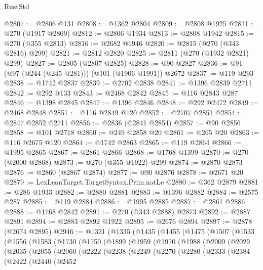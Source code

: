 \begin{lexlean}{RustStd}
\begin{coremodule}
@2807 := @2806 @131
@2808 := @1362 @2804
@2809 := @2808 @1925
@2811 := @270 (@1917 @2809)
@2812 := @2806 @1934
@2813 := @2808 @1942
@2815 := @270 (@355 @2813)
@2816 := @2682 @1946
@2820 := @2815 (@270 (@343 @2816) @299)
@2821 := @2812 @2820
@2825 := @2811 (@270 (@1932 @2821) @299)
@2827 := @2805 (@2807 @2825)
@2828 := @90 @2827
@2836 := @91 (@97 (@244 (@245 @281))) (@101 (@1906 @1991)) @2672
@2837 := @119 @293
@2838 := @1742 @2837
@2839 := @2702 @2838
@2841 := @1396 @2839 @2711
@2842 := @292 @133
@2843 := @2468 @2842
@2845 := @116 @2843 @287
@2846 := @1398 @2845
@2847 := @1396 @2846
@2848 := @292 @2472
@2849 := @2468 @2848
@2851 := @116 @2849 @120
@2852 := @2707 @2851
@2854 := @2847 @2852 @2711
@2856 := @2836 (@2841 @2854)
@2857 := @90 @2856
@2858 := @101 @2718
@2860 := @249 @2858 @20
@2861 := @265 @20
@2863 := @116 @2675 @120
@2864 := @1742 @2863
@2865 := @119 @2864
@2866 := @1995 @2865
@2867 := @2861 @2866
@2868 := @1768 @1399
@2870 := @270 (@2000 @2868)
@2873 := @270 (@355 @1922) @299
@2874 := @2870 @2873
@2876 := @2860 (@2867 @2874)
@2877 := @90 @2876
@2878 := @2671 @20
@2879 := LexLeanTarget.TargetSyntax.Prim.natLe
@2880 := @362 @2879
@2881 := @286 @1933
@2882 := @2880 @2881
@2883 := @1396 @2882
@2884 := @2575 @287
@2885 := @119 @2884
@2886 := @1995 @2885
@2887 := @2861 @2886
@2888 := @1768 @2842
@2891 := @270 (@343 @2888) @2873
@2892 := @2887 @2891
@2894 := @2883 @2892 @1922
@2895 := @2676 @2894
@2897 := @2878 (@2674 @2895)
@2946 := @1321
    (@1335
      (@1435
        (@1455
          (@1475
            (@1507
              (@1533
                (@1556
                  (@1583
                    (@1730
                      (@1750
                        (@1899
                          (@1959
                            (@1970
                              (@1988
                                (@2009
                                  (@2029
                                    (@2035
                                      (@2055
                                        (@2060
                                          (@2222
                                            (@2238
                                              (@2249
                                                (@2270
                                                  (@2280
                                                    (@2333
                                                      (@2384
                                                        (@2422
                                                          (@2440
                                                            (@2452

\end{coremodule}
\end{lexlean}
